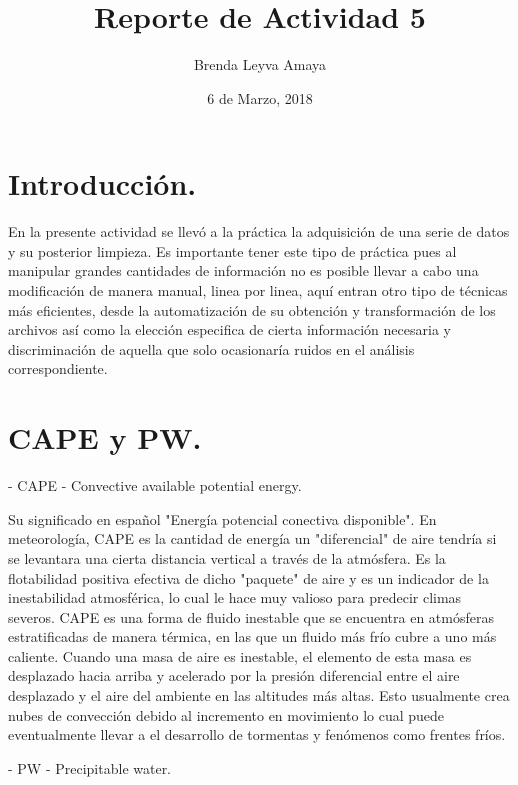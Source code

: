 \documentclass{article} %
\title{Reporte de Actividad 5}
\author{Brenda Leyva Amaya}
\date{6 de Marzo, 2018}
\begin{document}
\maketitle %


\section{Introducción.}

En la presente actividad se llevó a la práctica la adquisición de una serie de datos y su posterior limpieza. Es importante tener este tipo de práctica pues al manipular grandes cantidades de información no es posible llevar a cabo una modificación de manera manual, linea por linea, aquí entran otro tipo de técnicas más eficientes, desde la automatización de su obtención y transformación de los archivos así como la elección especifica de cierta información necesaria y discriminación de aquella que solo ocasionaría ruidos en el análisis correspondiente.

\section{CAPE y PW.}

\hspace{0.45 cm} - CAPE - Convective available potential energy.

\vspace{0.5 cm}

Su significado en español "Energía potencial conectiva disponible". En meteorología, CAPE es la cantidad de energía un "diferencial" de aire tendría si se levantara una cierta distancia vertical a través de la atmósfera. Es la flotabilidad positiva efectiva de dicho "paquete" de aire y es un indicador de la inestabilidad atmosférica, lo cual le hace muy valioso para predecir climas severos. CAPE es una forma de fluido inestable que se encuentra en atmósferas estratificadas de manera térmica, en las que un fluido más frío cubre a uno más caliente. Cuando una masa de aire es inestable, el elemento de esta masa es desplazado hacia arriba y acelerado por la presión diferencial entre el aire desplazado y el aire del ambiente en las altitudes más altas. Esto usualmente crea nubes de convección debido al incremento en movimiento lo cual puede eventualmente llevar a el desarrollo de tormentas y fenómenos como frentes fríos. 

\vspace{0.5 cm}

- PW - Precipitable water.
\end{document}
